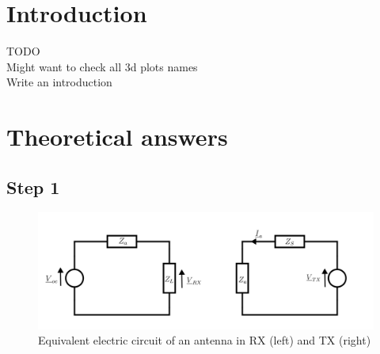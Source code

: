 \documentclass[10pt,a4paper]{ULBreport}
\begin{document}
 





\chapter{Introduction}

\begin{center}
    
    \Huge TODO\\
    \vspace{0.5cm}
    \large Might want to check all 3d plots names\\
    Write an introduction
    \normalsize
    
\end{center}
\chapter{Theoretical answers}

\section{Step 1}

\begin{figure}[H]
    \centering
    \includegraphics[width=1\textwidth]{circuit.png}
    \caption{Equivalent electric circuit of an antenna in RX (left) and TX (right)}
    \label{fig:equivalent_electrical_circuit}
\end{figure}
\end{document}
